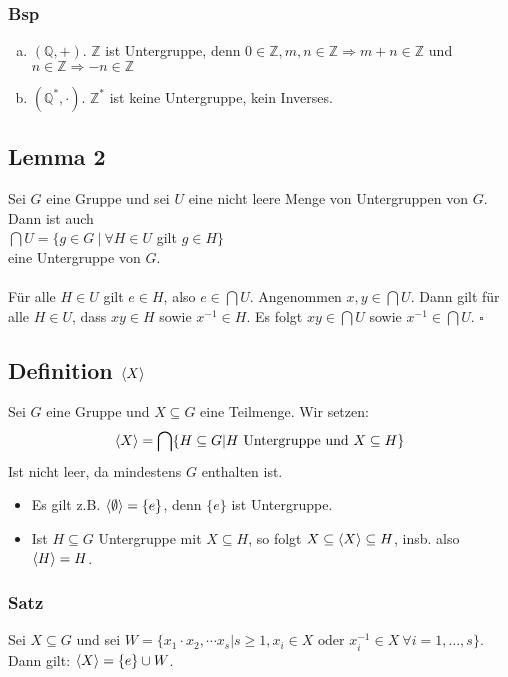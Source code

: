 \subsubsection*{Bsp}
\begin{enumerate}[(a)]
	\item $(\mathds{Q}, +)$. $\mathds{Z}$  ist Untergruppe, denn $0 \in \mathds{Z}, m,n \in \mathds{Z} \Rightarrow m+n\in \mathds{Z}$ und $n\in \mathds{Z} \Rightarrow -n\in \mathds{Z}$
	\item $(\mathds{Q}^*,\cdot)$. $\mathds{Z}^*$ ist keine Untergruppe, kein Inverses.
\end{enumerate}

\subsection{Lemma 2}
\label{sub:lemma_2}
Sei $G$ eine Gruppe und sei $U$ eine nicht leere Menge von Untergruppen von $G$. Dann ist auch\\
$\bigcap U = \{g\in G~|~\forall H\in U$ gilt $g\in H\}$\\
eine Untergruppe von $G$.\\

\\
Für alle $H\in U$ gilt $e\in H$, also $e\in \bigcap U$. Angenommen $x,y\in \bigcap U$. Dann gilt für alle $H\in U$, dass $xy\in H$ sowie $x^{-1}\in H$. Es folgt $xy\in \bigcap U$ sowie $x^{-1}\in \bigcap U$.
\hfill $\square$

\subsection{Definition $\langle X \rangle$}
\label{sub:def_lhX}
Sei $G$ eine Gruppe und $X \subseteq G$ eine Teilmenge. Wir setzen:
\[\langle X \rangle=\bigcap\{H\subseteq G | H \text{ Untergruppe und } X \subseteq H\}\]
Ist nicht leer, da mindestens $G$ enthalten ist.
\begin{itemize}
	\item Es gilt z.B. $\langle \emptyset \rangle=\{e\}$, denn $\{e\}$ ist Untergruppe.
	\item Ist $H \subseteq G$ Untergruppe mit $X \subseteq H$, so folgt $X\subseteq \langle X \rangle \subseteq H$, insb. also $\langle H \rangle=H$.
\end{itemize}

\subsubsection*{Satz}
Sei $X \subseteq G$ und sei $W=\{x_1\cdot x_2,\cdots x_s | s\ge 1, x_i\in X \text{ oder } x_i^{-1}\in X ~\forall i=1,\dots,s\}$.\\
Dann gilt: $ \langle X \rangle=\{e\}\cup W$.\\

